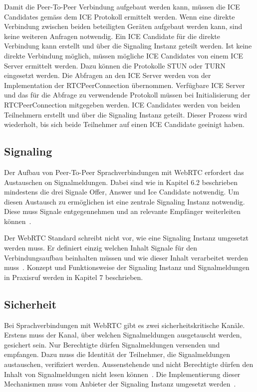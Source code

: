 Damit die Peer-To-Peer Verbindung aufgebaut werden kann, müssen die ICE Candidates gemäss dem ICE Protokoll ermittelt werden.
Wenn eine direkte Verbindung zwischen beiden beteiligten Geräten aufgebaut werden kann, sind keine weiteren Anfragen notwendig.
Ein ICE Candidate für die direkte Verbindung kann erstellt und über die Signaling Instanz geteilt werden.
Ist keine direkte Verbindung möglich, müssen mögliche ICE Candidates von einem ICE Server ermittelt werden.
Dazu können die Protokolle STUN oder TURN eingesetzt werden.
Die Abfragen an den ICE Server werden von der Implementation der RTCPeerConnection übernommen.
Verfügbare ICE Server und das für die Abfrage zu verwendende Protokoll müssen bei Initialisierung der RTCPeerConnection mitgegeben werden.
ICE Candidates werden von beiden Teilnehmern erstellt und über die Signaling Instanz geteilt.
Dieser Prozess wird wiederholt, bis sich beide Teilnehmer auf einen ICE Candidate geeinigt haben.

\subsection{Signaling}

Der Aufbau von Peer-To-Peer Sprachverbindungen mit WebRTC erfordert das Austauschen on Signalmeldungen.
Dabei sind wie in Kapitel 6.2 beschrieben mindestens die drei Signale Offer, Answer und Ice Candidate notwendig.
Um diesen Austausch zu ermöglichen ist eine zentrale Signaling Instanz notwendig.
Diese muss Signale entgegennehmen und an relevante Empfänger weiterleiten können~\cite{webrtc_spec}.

Der WebRTC Standard schreibt nicht vor, wie eine Signaling Instanz umgesetzt werden muss.
Er definiert einzig welchen Inhalt Signale für den Verbindungsaufbau beinhalten müssen und wie dieser Inhalt verarbeitet werden muss~\cite{webrtc_spec}.
Konzept und Funktionsweise der Signaling Instanz und Signalmeldungen in Praxisruf werden in Kapitel 7 beschrieben.

\subsection{Sicherheit}

Bei Sprachverbindungen mit WebRTC gibt es zwei sicherheitskritische Kanäle.
Erstens muss der Kanal, über welchen Signalmeldungen ausgetauscht werden, gesichert sein.
Nur Berechtigte dürfen Signalmeldungen versenden und empfangen.
Dazu muss die Identität der Teilnehmer, die Signalmeldungen austauschen, verifiziert werden.
Aussenstehende und nicht Berechtigte dürfen den Inhalt von Signalmeldungen nicht lesen können~\cite{rfc_8827_webRTC_SecurityArchitecture}.
Die Implementierung dieser Mechanismen muss vom Anbieter der Signaling Instanz umgesetzt werden~\cite{webrtc_spec}.

